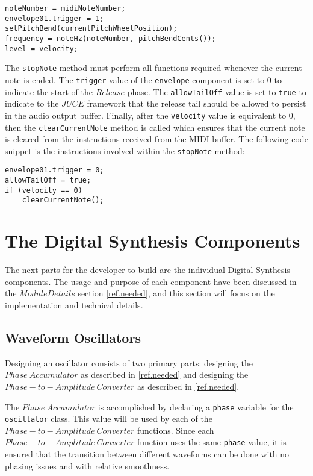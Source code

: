 \documentclass[a4paper,12pt]{report}
\begin{document}
\begin{lstlisting}
noteNumber = midiNoteNumber;
envelope01.trigger = 1;
setPitchBend(currentPitchWheelPosition);
frequency = noteHz(noteNumber, pitchBendCents());
level = velocity;
\end{lstlisting}

The \texttt{stopNote} method must perform all functions required whenever the current note is ended. The \texttt{trigger} value of the \texttt{envelope} component is set to $0$ to indicate the start of the $Release$ phase. The \texttt{allowTailOff} value is set to \texttt{true} to indicate to the $JUCE$ framework that the release tail should be allowed to persist in the audio output buffer. Finally, after the \texttt{velocity} value is equivalent to $0$, then the \texttt{clearCurrentNote} method is called which ensures that the current note is cleared from the instructions received from the MIDI buffer. The following code snippet is the instructions involved within the \texttt{stopNote} method:

\begin{lstlisting}
envelope01.trigger = 0;
allowTailOff = true;
if (velocity == 0)
    clearCurrentNote();
\end{lstlisting}

\section{The Digital Synthesis Components}
The next parts for the developer to build are the individual Digital Synthesis components. The usage and purpose of each component have been discussed in the $Module Details$ section \ref{ref.needed}, and this section will focus on the implementation and technical details.

\subsection{Waveform Oscillators}
Designing an oscillator consists of two primary parts: designing the $Phase\ Accumulator$ as described in \ref{ref.needed} and designing the $Phase-to-Amplitude\ Converter$ as described in \ref{ref.needed}.

The $Phase\ Accumulator$ is accomplished by declaring a \texttt{phase} variable for the \texttt{oscillator} class. This value will be used by each of the $Phase-to-Amplitude\ Converter$ functions. Since each $Phase-to-Amplitude\ Converter$ function uses the same \texttt{phase} value, it is ensured that the transition between different waveforms can be done with no phasing issues and with relative smoothness.
\end{document}
